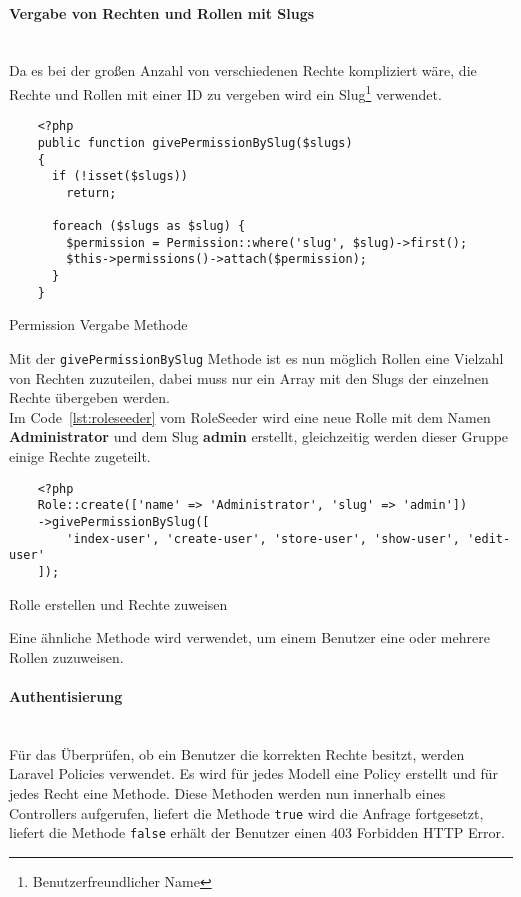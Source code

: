 \paragraph{Vergabe von Rechten und Rollen mit Slugs}\mbox{}\\
Da es bei der großen Anzahl von verschiedenen Rechte kompliziert wäre, die Rechte
und Rollen mit einer ID zu vergeben wird ein Slug\footnote{Benutzerfreundlicher
Name} verwendet.

\begin{listing}[H]
  \begin{verbatim}
    <?php
    public function givePermissionBySlug($slugs)
    {
      if (!isset($slugs))
        return;

      foreach ($slugs as $slug) {
        $permission = Permission::where('slug', $slug)->first();
        $this->permissions()->attach($permission);
      }
    }
  \end{verbatim}
  \caption{Permission Vergabe Methode}
\end{listing}

Mit der \verb|givePermissionBySlug| Methode ist es nun möglich Rollen eine
Vielzahl von Rechten zuzuteilen, dabei muss nur ein Array mit den Slugs der
einzelnen Rechte übergeben werden.\\

Im Code~\ref{lst:roleseeder} vom RoleSeeder wird eine neue Rolle mit
dem Namen \textbf{Administrator} und dem Slug \textbf{admin} erstellt,
gleichzeitig werden dieser Gruppe einige Rechte zugeteilt.

\begin{listing}[H]
  \begin{verbatim}
    <?php
    Role::create(['name' => 'Administrator', 'slug' => 'admin'])
    ->givePermissionBySlug([
        'index-user', 'create-user', 'store-user', 'show-user', 'edit-user'
    ]);
  \end{verbatim}
  \caption{Rolle erstellen und Rechte zuweisen}
  \label{lst:roleseeder}
\end{listing}

Eine ähnliche Methode wird verwendet, um einem Benutzer eine oder mehrere Rollen
zuzuweisen.

\paragraph{Authentisierung}\mbox{}\\
Für das Überprüfen, ob ein Benutzer die korrekten Rechte besitzt, werden Laravel
Policies verwendet. Es wird für jedes Modell eine Policy erstellt und für jedes
Recht eine Methode. Diese Methoden werden nun innerhalb eines Controllers
aufgerufen, liefert die Methode \verb|true| wird die Anfrage fortgesetzt,
liefert die Methode \verb|false| erhält der Benutzer einen 403 Forbidden HTTP Error.

